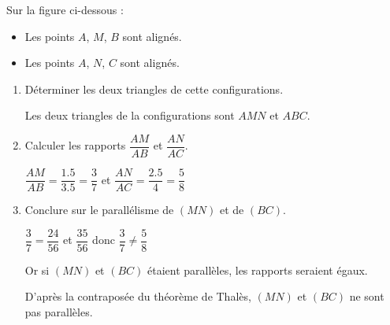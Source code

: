     Sur la figure ci-dessous :
    \begin{itemize}
        \item Les points $A$, $M$, $B$ sont alignés.
        \item Les points $A$, $N$, $C$ sont alignés.
    \end{itemize}
    \begin{spacing}{1.5}
        \begin{enumerate}
            \item Déterminer les deux triangles de cette configurations.

            {\color{red} Les deux triangles de la configurations sont $AMN$ et $ABC$.}
            \item Calculer les rapports $\dfrac{AM}{AB}$ et $\dfrac{AN}{AC}$.

            {\color{red}
            $\dfrac{AM}{AB}=\dfrac{\num{1.5}}{\num{3.5}}=\dfrac{3}{7}$ et $\dfrac{AN}{AC}=\dfrac{\num{2.5}}{\num{4}}=\dfrac{5}{8}$
            }
            \item Conclure sur le parallélisme de $(MN)$ et de $(BC)$.

            {\color{red}
            $\dfrac{3}{7}=\dfrac{24}{56}$ et $\dfrac{35}{56}$ donc $\dfrac{3}{7}\neq\dfrac{5}{8}$

            Or si $(MN)$ et $(BC)$ étaient parallèles, les rapports seraient égaux.

            D'après la contraposée du théorème de Thalès, $(MN)$ et $(BC)$ ne sont pas parallèles.
            }
        \end{enumerate}
    \end{spacing}
